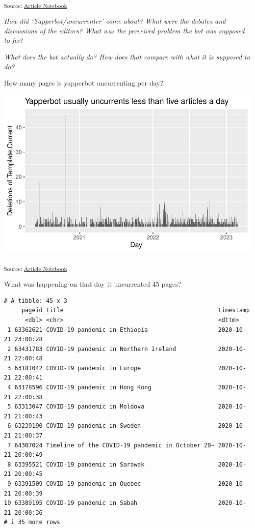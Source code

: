 \documentclass[
  Crown,
  times,
  sageh]{sagej}
\begin{document}
\textsubscript{Source:
\href{https://wikihistories.github.io/the-bot-that-makes-history/the-bot-that-makes-history.qmd.html}{Article
Notebook}}

\emph{How did `Yapperbot/uncurrenter' come about? What were the debates
and discussions of the editors? What was the perceived problem the bot
was supposed to fix?}

\emph{What does the bot actually do? How does that compare with what it
is supposed to do?}

How many pages is yapperbot uncurrenting per day?

\includegraphics[width=1\textwidth,height=\textheight]{the-bot-that-makes-history_files/figure-pdf/unnamed-chunk-3-1.pdf}

\textsubscript{Source:
\href{https://wikihistories.github.io/the-bot-that-makes-history/the-bot-that-makes-history.qmd.html}{Article
Notebook}}

What was happening on that day it uncurrented 45 pages?

\begin{verbatim}
# A tibble: 45 x 3
     pageid title                                            timestamp          
      <dbl> <chr>                                            <dttm>             
 1 63362621 COVID-19 pandemic in Ethiopia                    2020-10-21 23:00:28
 2 63431783 COVID-19 pandemic in Northern Ireland            2020-10-21 22:00:48
 3 63181042 COVID-19 pandemic in Europe                      2020-10-21 22:00:41
 4 63178596 COVID-19 pandemic in Hong Kong                   2020-10-21 22:00:38
 5 63313047 COVID-19 pandemic in Moldova                     2020-10-21 21:00:43
 6 63239190 COVID-19 pandemic in Sweden                      2020-10-21 21:00:37
 7 64307024 Timeline of the COVID-19 pandemic in October 20~ 2020-10-21 20:00:49
 8 63395521 COVID-19 pandemic in Sarawak                     2020-10-21 20:00:45
 9 63391509 COVID-19 pandemic in Quebec                      2020-10-21 20:00:39
10 63389195 COVID-19 pandemic in Sabah                       2020-10-21 20:00:36
# i 35 more rows
\end{verbatim}
\end{document}
